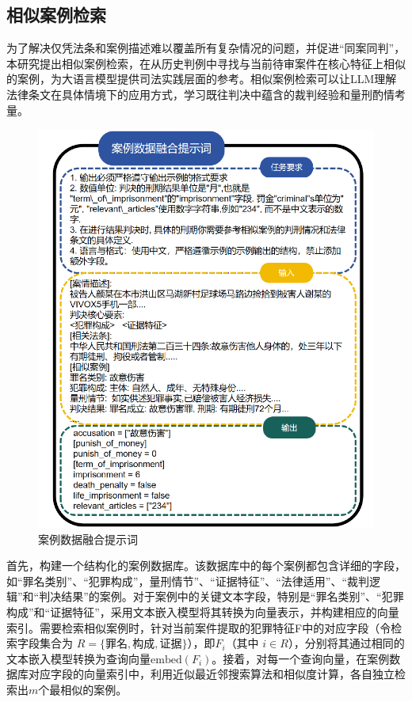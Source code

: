 \subsection{\heiti 相似案例检索}
为了解决仅凭法条和案例描述难以覆盖所有复杂情况的问题，并促进“同案同判”， 本研究提出相似案例检索，在从历史判例中寻找与当前待审案件在核心特征上相似的案例，为大语言模型提供司法实践层面的参考。相似案例检索可以让LLM理解法律条文在具体情境下的应用方式，学习既往判决中蕴含的裁判经验和量刑酌情考量。
\begin{figure}[H]
	\centering
	\includegraphics[width=1\linewidth]{fig/prompt2.2.pdf}
	\caption{案例数据融合提示词
	}
	\label{fig:prompt2}
\end{figure}
首先，构建一个结构化的案例数据库。该数据库中的每个案例都包含详细的字段，如“罪名类别”、“犯罪构成”，量刑情节”、“证据特征”、“法律适用”、“裁判逻辑”和“判决结果”的案例。对于案例中的关键文本字段，特别是“罪名类别”、“犯罪构成”和“证据特征”，采用文本嵌入模型将其转换为向量表示，并构建相应的向量索引。需要检索相似案例时，针对当前案件提取的犯罪特征F中的对应字段（令检索字段集合为 $R=\{\text{罪名},\text{构成},\text{证据}\}$），即$F_{i}$​（其中 $i \in R$），分别将其通过相同的文本嵌入模型转换为查询向量$\text{embed}(F_{i})$。接着，对每一个查询向量，在案例数据库对应字段的向量索引中，利用近似最近邻搜索算法和相似度计算，各自独立检索出$m$个最相似的案例。
